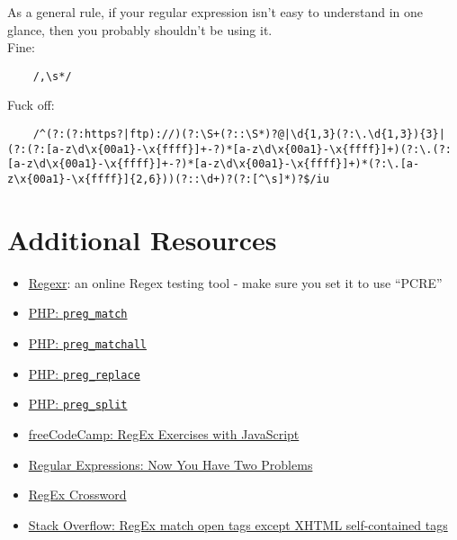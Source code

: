 As a general rule, if your regular expression isn't easy to understand in one glance, then you probably shouldn't be using it.
\\

Fine:

\begin{verbatim}
    /,\s*/
\end{verbatim}

Fuck off:

\begin{verbatim}
    /^(?:(?:https?|ftp)://)(?:\S+(?::\S*)?@|\d{1,3}(?:\.\d{1,3}){3}|(?:(?:[a-z\d\x{00a1}-\x{ffff}]+-?)*[a-z\d\x{00a1}-\x{ffff}]+)(?:\.(?:[a-z\d\x{00a1}-\x{ffff}]+-?)*[a-z\d\x{00a1}-\x{ffff}]+)*(?:\.[a-z\x{00a1}-\x{ffff}]{2,6}))(?::\d+)?(?:[^\s]*)?$/iu
\end{verbatim}



\section{Additional Resources}

\begin{itemize}[leftmargin=*]
    \item \href{https://regexr.com}{Regexr}: an online Regex testing tool - make sure you set it to use ``PCRE''
    \item \href{http://www.php.net/manual/en/function.preg-match.php}{PHP: \texttt{preg\_match}}
    \item \href{http://www.php.net/manual/en/function.preg-match-all.php}{PHP: \texttt{preg\_matchall}}
    \item \href{http://www.php.net/manual/en/function.preg-replace.php}{PHP: \texttt{preg\_replace}}
    \item \href{http://www.php.net/manual/en/function.preg-split.php}{PHP: \texttt{preg\_split}}
    \item \href{https://www.freecodecamp.org/learn/javascript-algorithms-and-data-structures/regular-expressions/using-the-test-method}{freeCodeCamp: RegEx Exercises with JavaScript}
    \item \href{https://blog.codinghorror.com/regular-expressions-now-you-have-two-problems/}{Regular Expressions: Now You Have Two Problems}
    \item \href{http://www.regexcrossword.com/}{RegEx Crossword}
    \item \href{https://stackoverflow.com/a/1732454}{Stack Overflow: RegEx match open tags except XHTML self-contained tags}
\end{itemize}
